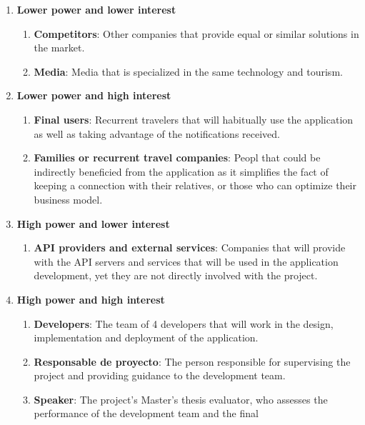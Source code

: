 \documentclass[../memory.tex]{subfiles}
\begin{document}
\begin{enumerate}[label = -]
	\item \textbf{Lower power and lower interest}
	      \begin{enumerate}[label = -]
		      \item \textbf{Competitors}: Other companies that provide equal or
		            similar solutions in the market.
		      \item \textbf{Media}: Media that is specialized in the same technology
		            and tourism.
	      \end{enumerate}
	\item \textbf{Lower power and high interest}
	      \begin{enumerate}[label = -]
		      \item \textbf{Final users}: Recurrent travelers that will habitually
		            use the application as well as taking advantage of the
		            notifications received.
		      \item \textbf{Families or recurrent travel companies}: Peopl that
		            could be indirectly beneficied from the application as it
		            simplifies the fact of keeping a connection with their
		            relatives, or those who can optimize their business model.
	      \end{enumerate}
	\item \textbf{High power and lower interest}
	      \begin{enumerate}[label = -]
		      \item \textbf{API providers and external services}: Companies that
		            will provide with the API servers and services that will be used
		            in the application development, yet they are not directly
		            involved with the project.
	      \end{enumerate}
	\item \textbf{High power and high interest}
	      \begin{enumerate}[label = -]
		      \item \textbf{Developers}: The team of 4 developers that will work in
		            the design, implementation and deployment of the application.
		      \item \textbf{Responsable de proyecto}: The person responsible for
		            supervising the project and providing guidance to the
		            development team.
		      \item \textbf{Speaker}: The project's Master's thesis evaluator, who
		            assesses the performance of the development team and the final

\end{enumerate}
\end{enumerate}
\end{document}
